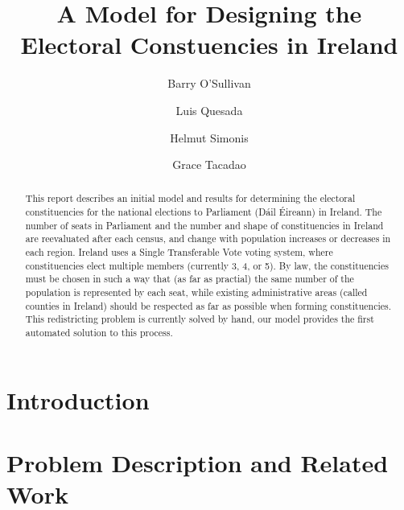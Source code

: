 \documentclass[runningheads]{llncs}
\begin{document}
\title{A Model for Designing the Electoral Constuencies in Ireland}

\author{Barry O'Sullivan  \and Luis Quesada \and  Helmut Simonis \and Grace Tacadao}

\authorrunning{}


\maketitle              

\begin{abstract}
This report describes an initial model and results for determining the electoral constituencies for the national elections to Parliament (Dáil Éireann) in Ireland. The number of seats in Parliament and the number and shape of constituencies in Ireland are reevaluated after each census, and change with population increases or decreases in each region. Ireland uses a Single Transferable Vote voting system, where constituencies elect multiple members (currently 3, 4, or 5). By law, the constituencies must be chosen in such a way that (as far as practial) the same number of the population is represented by each seat, while existing administrative areas (called counties in Ireland) should be respected as far as possible when forming constituencies. This redistricting problem is currently solved by hand, our model provides the first automated solution to this process. 

\end{abstract}



\section{Introduction}
\label{sec:introduction}


\section{Problem Description and Related Work}
\label{sec:problem}
\end{document}
